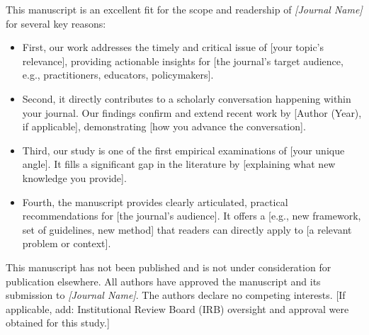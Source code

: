 \documentclass[11pt]{article}
\begin{document}
\noindent This manuscript is an excellent fit for the scope and readership of \textit{[Journal Name]} for several key reasons:

\begin{itemize}
    \item First, our work addresses the timely and critical issue of [your topic's relevance], providing actionable insights for [the journal's target audience, e.g., practitioners, educators, policymakers].

    \item Second, it directly contributes to a scholarly conversation happening within your journal. Our findings confirm and extend recent work by [Author (Year), if applicable], demonstrating [how you advance the conversation].

    \item Third, our study is one of the first empirical examinations of [your unique angle]. It fills a significant gap in the literature by [explaining what new knowledge you provide].

    \item Fourth, the manuscript provides clearly articulated, practical recommendations for [the journal's audience]. It offers a [e.g., new framework, set of guidelines, new method] that readers can directly apply to [a relevant problem or context].
\end{itemize}

This manuscript has not been published and is not under consideration for publication elsewhere. All authors have approved the manuscript and its submission to \textit{[Journal Name]}. The authors declare no competing interests. [If applicable, add: Institutional Review Board (IRB) oversight and approval were obtained for this study.]\\
\end{document}
